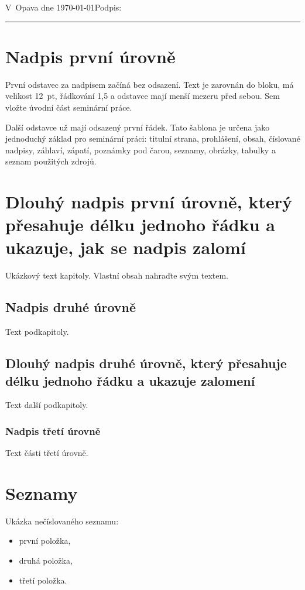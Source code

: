 \documentclass[12pt,a4paper]{article}
\newcommand{\misto}{Opava}
\newcommand{\blankpage}{\newpage\thispagestyle{front}\null\newpage}
\begin{document}
\vspace{1.5cm}
\noindent V~\misto{} dne \today \hfill Podpis: \rule{45mm}{0.4pt}

\blankpage

\thispagestyle{front}
\tableofcontents
\newpage

\section{Nadpis první úrovně}
První odstavec za nadpisem začíná bez odsazení. Text je zarovnán do bloku, má velikost 12~pt, řádkování 1,5 a odstavce mají menší mezeru před sebou. Sem vložte úvodní část seminární práce.

Další odstavce už mají odsazený první řádek. Tato šablona je určena jako jednoduchý základ pro seminární práci: titulní strana, prohlášení, obsah, číslované nadpisy, záhlaví, zápatí, poznámky pod čarou, seznamy, obrázky, tabulky a seznam použitých zdrojů.

\section{Dlouhý nadpis první úrovně, který přesahuje délku jednoho řádku a ukazuje, jak se nadpis zalomí}
Ukázkový text kapitoly. Vlastní obsah nahraďte svým textem.

\subsection{Nadpis druhé úrovně}
Text podkapitoly.

\subsection{Dlouhý nadpis druhé úrovně, který přesahuje délku jednoho řádku a ukazuje zalomení}
Text další podkapitoly.

\subsubsection{Nadpis třetí úrovně}
Text části třetí úrovně.

\section{Seznamy}
Ukázka nečíslovaného seznamu:
\begin{itemize}
  \item první položka,
  \item druhá položka,
  \item třetí položka.
\end{itemize}
\end{document}

